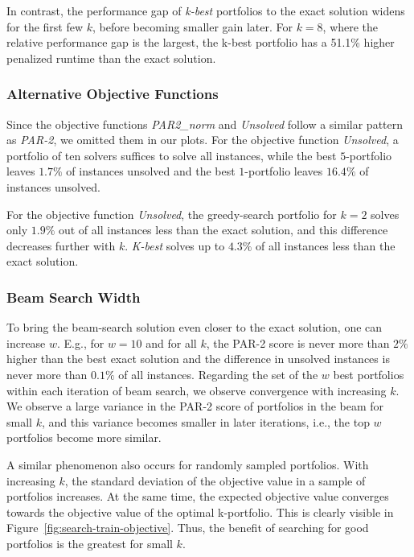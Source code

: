 \documentclass[conference]{IEEEtran}
\begin{document}
In contrast, the performance gap of \emph{k-best} portfolios to the exact solution widens for the first few $k$, before becoming smaller gain later.
For $k=8$, where the relative performance gap is the largest, the k-best portfolio has a 51.1\% higher penalized runtime than the exact solution.


\subsubsection{Alternative Objective Functions}

Since the objective functions \emph{PAR2\_norm} and \emph{Unsolved} follow a similar pattern as \emph{PAR-2}, we omitted them in our plots. 
For the objective function \emph{Unsolved}, a portfolio of ten solvers suffices to solve all instances, while the best $5$-portfolio leaves $1.7\%$ of instances unsolved and the best $1$-portfolio leaves $16.4\%$ of instances unsolved.

For the objective function \emph{Unsolved}, the greedy-search portfolio for $k=2$ solves only $1.9\%$ out of all instances less than the exact solution, and this difference decreases further with $k$.
\emph{K-best} solves up to $4.3\%$ of all instances less than the exact solution.


\subsubsection{Beam Search Width}

To bring the beam-search solution even closer to the exact solution, one can increase $w$.
E.g., for $w=10$ and for all $k$, the PAR-2 score is never more than $2\%$ higher than the best exact solution and the difference in unsolved instances is never more than $0.1\%$ of all instances.
Regarding the set of the $w$ best portfolios within each iteration of beam search, we observe convergence with increasing $k$. 
We observe a large variance in the PAR-2 score of portfolios in the beam for small $k$, and this variance becomes smaller in later iterations, i.e., the top $w$ portfolios become more similar. 

A similar phenomenon also occurs for randomly sampled portfolios. 
With increasing $k$, the standard deviation of the objective value in a sample of portfolios increases.
At the same time, the expected objective value converges towards the objective value of the optimal k-portfolio.
This is clearly visible in Figure~\ref{fig:search-train-objective}.
Thus, the benefit of searching for good portfolios is the greatest for small $k$.
\end{document}

